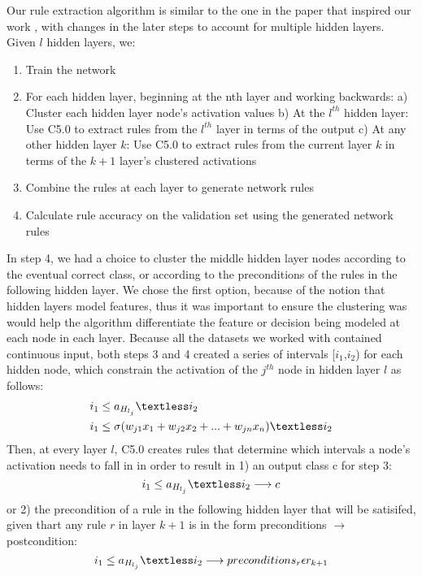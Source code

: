 Our rule extraction algorithm is similar to the one in the paper that inspired our work \cite{thuan11}, with changes in the later steps to account for multiple hidden layers. Given $l$ hidden layers, we:
\begin{enumerate}
\item
Train the network
\item
For each hidden layer, beginning at the nth layer and working backwards:
\subitem
a) Cluster each hidden layer node’s activation values 
\subitem
b) At the $l^{th}$ hidden layer: Use C5.0 \cite{C5} to extract rules from
the $l^{th}$ layer in terms of the output
\subitem
c) At any other hidden layer $k$: Use C5.0 to extract rules from
the current layer $k$ in terms of the $k+1$ layer's clustered activations
\item
Combine the rules at each layer to generate network rules
\item 
Calculate rule accuracy on the validation set using the generated network rules
\end{enumerate}

In step 4, we had a choice to cluster the middle hidden layer nodes
according to the eventual correct class, or according to the
preconditions of the rules in the following hidden layer. We chose the
first option, because of the notion that hidden layers model features,
thus it was important to ensure the clustering was would help the
algorithm differentiate the feature or decision being modeled at each
node in each layer. Because all the datasets we worked with contained
continuous input, both steps 3 and 4 created a series of intervals [$i_1$,$i_2$) for
each hidden node, which constrain the activation of the $j^{th}$ node in hidden
layer $l$ as follows:
\begin{equation}
  \begin{split}
    &i_1 \le a_{H_{l_j}} \textless i_2 \\
    &i_1 \le \sigma(w_{j1}x_1 + w_{j2}x_2 + ... + w_{jn}x_n)  \textless i_2
  \end{split}
\end{equation}
Then, at every layer $l$, C5.0 creates rules that determine which intervals a node's
activation needs to fall in in order to result in 1) an output class c
for step 3:
\begin{equation}
  i_1 \le a_{H_{l_j}} \textless i_2  \longrightarrow  c
\end{equation}
or 2) the precondition of a rule in the following hidden layer that
will be satisifed, given thart any rule $r$ in layer $k + 1$ is in the form preconditions
$\longrightarrow$ postcondition:
\begin{equation}
  i_1 \le a_{H_{l_j}}  \textless i_2  \longrightarrow preconditions_r \epsilon r_{k+1}
\end{equation}

